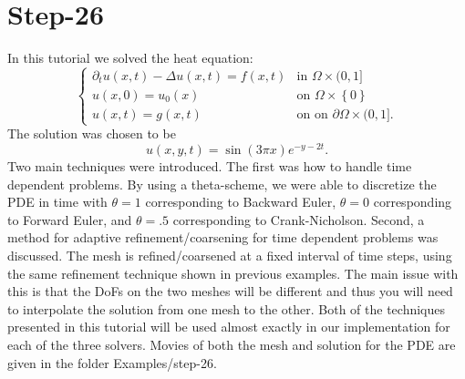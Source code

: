 \documentclass[11pt,fullpage]{article}
\newcommand{\set}[1]{\left\{#1\right\}}
\theoremstyle{lemma}
\theoremstyle{definition}
\theoremstyle{lemma}
\begin{document}
\section*{Step-26}
In this tutorial we solved the heat equation:
$$
\begin{cases}
\partial_t u(x,t) -\Delta u(x,t) = f(x,t) &\text{in }\Omega\times (0,1]\\
u(x,0) = u_0(x) & \text{on } \Omega \times \set{0}\\
u(x,t) = g(x,t) & \text{on }\text{on }\partial\Omega\times (0,1].
\end{cases}
$$
The solution was chosen to be
$$
u(x,y,t) = \sin(3\pi x)e^{-y-2t}.
$$
Two main techniques were introduced. The first was how to handle time dependent problems. By using a theta-scheme, we were able to discretize the PDE in time with $\theta=1$ corresponding to Backward Euler, $\theta = 0$ corresponding to Forward Euler, and $\theta = .5$ corresponding to Crank-Nicholson. Second, a method for adaptive refinement/coarsening for time dependent problems was discussed. The mesh is refined/coarsened at a fixed interval of time steps, using the same refinement technique shown in previous examples. The main issue with this is that the DoFs on the two meshes will be different and thus you will need to interpolate the solution from one mesh to the other. Both of the techniques presented in this tutorial will be used almost exactly in our implementation for each of the three solvers. Movies of both the mesh and solution for the PDE are given in the folder Examples/step-26.



\end{document}
